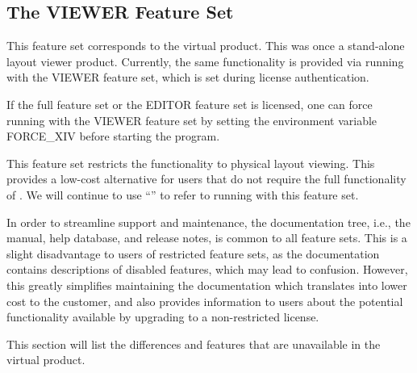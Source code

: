 \subsection{The VIEWER Feature Set}
This feature set corresponds to the {\Xiv} virtual product.  This was
once a stand-alone layout viewer product.  Currently, the same
functionality is provided via running {\Xic} with the VIEWER feature
set, which is set during license authentication.

If the full {\Xic} feature set or the EDITOR feature set is licensed,
one can force running with the VIEWER feature set by setting the
environment variable {\et FORCE\_XIV} before starting the {\Xic}
program.

This feature set restricts the functionality to physical layout
viewing.  This provides a low-cost alternative for users that do not
require the full functionality of {\Xic}.  We will continue to use
``{\Xiv}'' to refer to {\Xic} running with this feature set.

In order to streamline support and maintenance, the documentation
tree, i.e., the manual, help database, and release notes, is common to
all feature sets.  This is a slight disadvantage to users of
restricted feature sets, as the documentation contains descriptions of
disabled features, which may lead to confusion.  However, this greatly
simplifies maintaining the documentation which translates into lower
cost to the customer, and also provides information to users about the
potential functionality available by upgrading to a non-restricted
license.

This section will list the differences and features that are
unavailable in the {\Xiv} virtual product.


